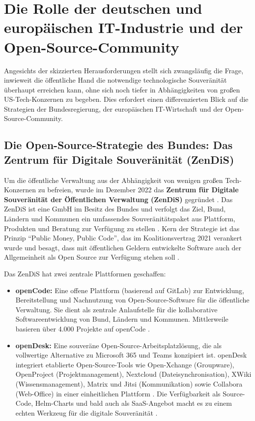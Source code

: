 \documentclass[12pt,a4paper]{article}
\begin{document}
	\section{Die Rolle der deutschen und europäischen IT-Industrie und der Open-Source-Community}
	
	Angesichts der skizzierten Herausforderungen stellt sich zwangsläufig die Frage, inwieweit die öffentliche Hand die notwendige technologische Souveränität überhaupt erreichen kann, ohne sich noch tiefer in Abhängigkeiten von großen US-Tech-Konzernen zu begeben. Dies erfordert einen differenzierten Blick auf die Strategien der Bundesregierung, der europäischen IT-Wirtschaft und der Open-Source-Community.
	
	\subsection{Die Open-Source-Strategie des Bundes: Das Zentrum für Digitale Souveränität (ZenDiS)}
	
	Um die öffentliche Verwaltung aus der Abhängigkeit von wenigen großen Tech-Konzernen zu befreien, wurde im Dezember 2022 das \textbf{Zentrum für Digitale Souveränität der Öffentlichen Verwaltung (ZenDiS)} gegründet \cite{ZenDiS2025}. Das ZenDiS ist eine GmbH im Besitz des Bundes und verfolgt das Ziel, Bund, Ländern und Kommunen ein umfassendes Souveränitätspaket aus Plattform, Produkten und Beratung zur Verfügung zu stellen \cite{ZenDiS2025}. Kern der Strategie ist das Prinzip \enquote{Public Money, Public Code}, das im Koalitionsvertrag 2021 verankert wurde und besagt, dass mit öffentlichen Geldern entwickelte Software auch der Allgemeinheit als Open Source zur Verfügung stehen soll \cite{SovereignTechFund2025}.
	
	Das ZenDiS hat zwei zentrale Plattformen geschaffen:
	\begin{itemize}
		\item \textbf{openCode:} Eine offene Plattform (basierend auf GitLab) zur Entwicklung, Bereitstellung und Nachnutzung von Open-Source-Software für die öffentliche Verwaltung. Sie dient als zentrale Anlaufstelle für die kollaborative Softwareentwicklung von Bund, Ländern und Kommunen. Mittlerweile basieren über 4.000 Projekte auf openCode \cite{Heise2025a}.
		\item \textbf{openDesk:} Eine souveräne Open-Source-Arbeitsplatzlösung, die als vollwertige Alternative zu Microsoft 365 und Teams konzipiert ist. openDesk integriert etablierte Open-Source-Tools wie Open-Xchange (Groupware), OpenProject (Projektmanagement), Nextcloud (Dateisynchronisation), XWiki (Wissensmanagement), Matrix und Jitsi (Kommunikation) sowie Collabora (Web-Office) in einer einheitlichen Plattform \cite{AllThingsOpen2025}. Die Verfügbarkeit als Source-Code, Helm-Charts und bald auch als SaaS-Angebot macht es zu einem echten Werkzeug für die digitale Souveränität \cite{AllThingsOpen2025}.
	\end{itemize}
	
\end{document}
